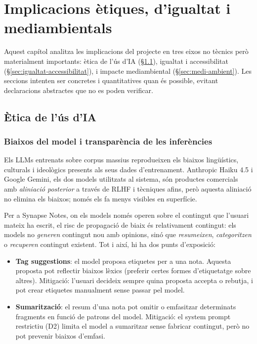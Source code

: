 \chapter{Implicacions ètiques, d'igualtat i mediambientals}
\label{ch:etica}

Aquest capítol analitza les implicacions del projecte en tres eixos no tècnics però materialment importants: ètica de l'ús d'IA (\S\ref{sec:etica-ia}), igualtat i accessibilitat (\S\ref{sec:igualtat-accessibilitat}), i impacte mediambiental (\S\ref{sec:medi-ambient}). Les seccions intenten ser concretes i quantitatives quan és possible, evitant declaracions abstractes que no es poden verificar.

\section{Ètica de l'ús d'IA}
\label{sec:etica-ia}

\subsection{Biaixos del model i transparència de les inferències}

Els LLMs entrenats sobre corpus massius reprodueixen els biaixos lingüístics, culturals i ideològics presents als seus dades d'entrenament. Anthropic Haiku 4.5 i Google Gemini, els dos models utilitzats al sistema, són productes comercials amb \emph{aliniació posterior} a través de RLHF i tècniques afins, però aquesta aliniació no elimina els biaixos; només els fa menys visibles en superfície.

Per a Synapse Notes, on els models només operen sobre el contingut que l'usuari mateix ha escrit, el risc de propagació de biaix és relativament contingut: els models no \emph{generen} contingut nou amb opinions, sinó que \emph{resumeixen}, \emph{categoritzen} o \emph{recuperen} contingut existent. Tot i així, hi ha dos punts d'exposició:

\begin{itemize}
    \item \textbf{Tag suggestions}: el model proposa etiquetes per a una nota. Aquesta proposta pot reflectir biaixos lèxics (preferir certes formes d'etiquetatge sobre altres). Mitigació: l'usuari decideix sempre quina proposta accepta o rebutja, i pot crear etiquetes manualment sense passar pel model.
    \item \textbf{Sumarització}: el resum d'una nota pot omitir o emfasitzar determinats fragments en funció de patrons del model. Mitigació: el system prompt restrictiu (D2) limita el model a sumaritzar sense fabricar contingut, però no pot prevenir biaixos d'emfasi.
\end{itemize}

